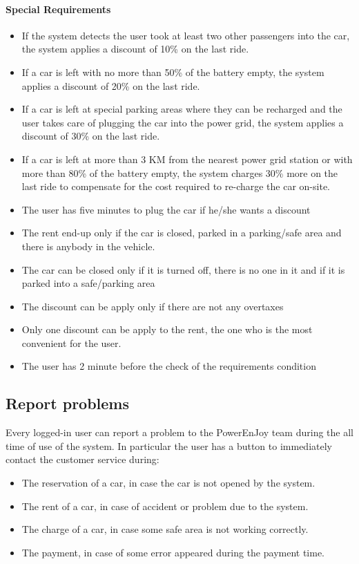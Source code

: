 \paragraph{Special Requirements}
\begin{itemize}
	\item If the system detects the user took at least two other passengers into the car, the system applies a discount of 10\% on the last ride.
	\item If a car is left with no more than 50\% of the battery empty, the system applies a discount of 20\% on the last ride.
	\item If a car is left at special parking areas where they can be recharged and the user takes care of plugging the car into the power grid, the system applies a discount of 30\% on the last ride.
	\item If a car is left at more than 3 KM from the nearest power grid station or with more than 80\% of the battery empty, the system charges 30\% more on the last ride to compensate for the cost required to re-charge the car on-site.
	\item The user has five minutes to plug the car if he/she wants a discount
	\item The rent end-up only if the car is closed, parked in a parking/safe area and there is anybody in the vehicle.
	\item The car can be closed only if it is turned off, there is no one in it and if it is parked into a safe/parking area
	\item The discount can be apply only if there are not any overtaxes
	\item Only one discount can be apply to the rent, the one who is the most convenient for the user.
	\item The user has 2 minute before the check of the requirements condition 
\end{itemize}

\subsection{Report problems}
Every logged-in user can report a problem to the PowerEnJoy team during the all time of use of the system. In particular the user has a button to immediately contact the customer service during:
\begin{itemize}
	\item The reservation of a car, in case the car is not opened by the system.
	\item The rent of a car, in case of accident or problem due to the system.
	\item The charge of a car, in case some safe area is not working correctly.
	\item The payment, in case of some error appeared during the payment time.
\end{itemize}
